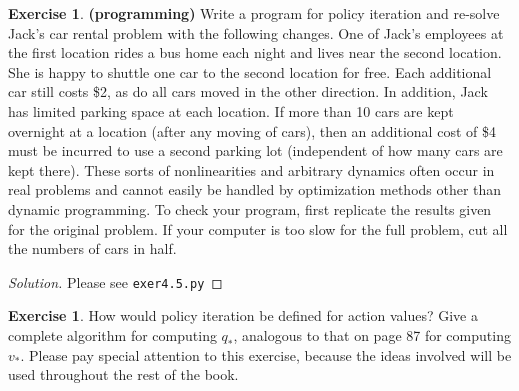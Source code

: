 \documentclass[oneside,11pt]{article}
\theoremstyle{definition}
\newtheorem{exer}[thm]{Exercise}
\newcommand{\qstar}{q_{\ast}}
\newcommand{\vstar}{v_{\ast}}
\newenvironment{solution}
{\renewcommand\qedsymbol{$\blacksquare$}\begin{proof}[Solution]} {\end{proof}}
\begin{document}
\begin{exer}
 \textbf{(programming)} Write a program for policy iteration and re-solve Jack's car rental problem with the following changes. One of Jack's employees at the first location rides a bus home each night and lives near the second location. She is happy to shuttle one car to the second location for free. Each additional car still costs \$2, as do all cars moved in the other direction. In addition, Jack has limited parking space at each location. If more than 10 cars are kept overnight at a location (after any moving of cars), then an additional cost of \$4 must be incurred to use a second parking lot (independent of how many cars are kept there). These sorts of nonlinearities and arbitrary dynamics often occur in real problems and cannot easily be handled by optimization methods other than dynamic programming. To check your program, first replicate the results given for the original problem. If your computer is too slow for the full problem, cut all the numbers of cars in half.
\end{exer}

\begin{shaded}
\begin{solution} 
Please see \texttt{exer4.5.py}
\end{solution} 
\end{shaded}


\begin{exer}
How would policy iteration be defined for action values? Give a complete algorithm for computing $\qstar$, analogous to that on page 87 for computing $\vstar$. Please pay special attention to this exercise, because the ideas involved will be used throughout the rest of the book.
\end{exer}
\end{document}
